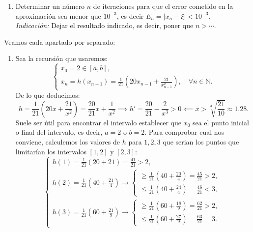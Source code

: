 {\begin{enumerate}[label=\alph*)]
  \item Determinar un número $n$ de iteraciones para que el error cometido en la aproximación sea menor que $10^{-3}$, es decir $E_n = |x_n - \xi| < 10^{-3}$. \\
  \textit{Indicación:} Dejar el resultado indicado, es decir, poner que $n > \cdots$.
\end{enumerate}
}{%
%
    Veamos cada apartado por separado:
    \begin{enumerate}[label=\alph*)]
        \item Sea la recursión que usaremos:
        \[
            \begin{cases}
                x_0 = 2 \in [a,b], \\
                x_n = h(x_{n-1}) = \frac{1}{21}\left(20x_{n-1} + \frac{21}{x_{n-1}^2}\right), \quad \forall n \in \mathbb{N}.
            \end{cases}
        \]
        De lo que deducimos:
        \[
            h = \frac{1}{21}\left(20x + \frac{21}{x^2}\right) = \frac{20}{21}x + \frac{1}{x^2} \implies
            h' = \frac{20}{21} - \frac{2}{x^3} > 0 \impliedby x > \sqrt[3]{\frac{21}{10}} \approx 1.28.
        \]
        Suele ser útil para encontrar el intervalo establecer que $x_0$ sea el punto inicial o final del intervalo, es decir, $a = 2$ o $b = 2$. Para comprobar cual nos conviene, calculemos los valores de $h$ para $1,2,3$ que serian los puntos que limitarían los intervalos $[1,2]$ y $[2,3]$:
        \[
            \begin{cases}
                h(1) = \frac{1}{21}(20 + 21) = \frac{41}{21} > 2, \\
                h(2) = \frac{1}{21}\left(40 + \frac{21}{4}\right) \rightarrow
                \begin{cases}
                    \geq \frac{1}{21}\left(40 + \frac{20}{4}\right) = \frac{45}{21} > 2, \\
                    \leq \frac{1}{21}\left(40 + \frac{24}{4}\right) = \frac{46}{21} < 3,
                \end{cases} \\
                h(3) = \frac{1}{21}\left(60 + \frac{21}{9}\right) \rightarrow
                \begin{cases}
                    \geq \frac{1}{21}\left(60 + \frac{18}{9}\right) = \frac{62}{21} > 2, \\
                    \leq \frac{1}{21}\left(60 + \frac{27}{9}\right) = \frac{63}{21} = 3.
                \end{cases}

\end{cases}\]
\end{enumerate}}
